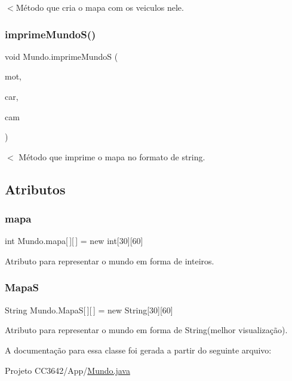 $<$Método que cria o mapa com os veiculos nele. \mbox{\label{class_mundo_a52455726daee2575ad03b11441fea89e}} 
\subsubsection{\texorpdfstring{imprime\+Mundo\+S()}{imprimeMundoS()}}
{\footnotesize\ttfamily void Mundo.\+imprime\+MundoS (\begin{DoxyParamCaption}\item[{Array\+List$<$ \mbox{\hyperlink{class_moto}{Moto}} $>$}]{mot,  }\item[{Array\+List$<$ \mbox{\hyperlink{class_carro}{Carro}} $>$}]{car,  }\item[{Array\+List$<$ \mbox{\hyperlink{class_caminhao}{Caminhao}} $>$}]{cam }\end{DoxyParamCaption})}

$<$ Método que imprime o mapa no formato de string. 

\subsection{Atributos}
\mbox{\label{class_mundo_a8332b2d52b9f317338a4d6cbe10bbcbb}} 
\subsubsection{\texorpdfstring{mapa}{mapa}}
{\footnotesize\ttfamily int Mundo.\+mapa\mbox{[}$\,$\mbox{]}\mbox{[}$\,$\mbox{]} = new int\mbox{[}30\mbox{]}\mbox{[}60\mbox{]}}



Atributo para representar o mundo em forma de inteiros. 

\mbox{\label{class_mundo_ac3b4e49cf251690a1ad421b3e8458ec6}} 
\subsubsection{\texorpdfstring{MapaS}{MapaS}}
{\footnotesize\ttfamily String Mundo.\+MapaS\mbox{[}$\,$\mbox{]}\mbox{[}$\,$\mbox{]} = new String\mbox{[}30\mbox{]}\mbox{[}60\mbox{]}}



Atributo para representar o mundo em forma de String(melhor visualização). 



A documentação para essa classe foi gerada a partir do seguinte arquivo\+:\begin{DoxyCompactItemize}
\item 
Projeto C\+C3642/\+App/\mbox{\hyperlink{_mundo_8java}{Mundo.\+java}}\end{DoxyCompactItemize}
